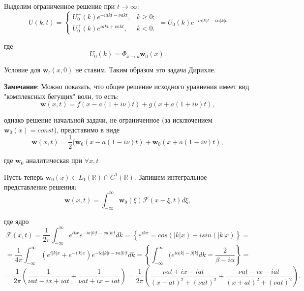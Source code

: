 \documentclass{article}
\begin{document}
Выделим ограниченное решение при $t \to \infty$:
\begin{equation*}
    U(k,t) =
	\begin{cases}
      U_0^-(k) e^{-i a k t - \nu a k t}, & k \geqslant 0;\\
      U_0^+(k) e^{i a k t + \nu a k t},  & k <0.
     \end{cases}
     = U_0(k) e^{-i a |k| t - \nu a |k| t}
\end{equation*}

где
\begin{equation*}
    U_0(k) = \Phi_{x \to k} \mathbf{w}_0(x).
\end{equation*}

Условие для $\mathbf{w}_t(x,0)$ не ставим. Таким образом это задача Дирихле.

\textbf{Замечание}: Можно показать, что общее решение исходного уравнения имеет вид "комплексных бегущих" волн, то есть:
\begin{equation*}
\mathbf{w}(x,t) = f(x-a(1+i\nu)t) + g(x + a(1+i\nu)t),
\end{equation*}

однако решение начальной задачи, не ограниченное (за исключением $\mathbf{w}_0(x) = const$), представимо в виде
\begin{equation*}
\mathbf{w}(x,t) = \dfrac{1}{2}(\mathbf{w}_0 (x-a(1-i\nu)t) + \mathbf{w}_0(x + a(1-i\nu)t),
\end{equation*}

где $\mathbf{w}_0$ аналитическая при $\forall x,t$ 


Пусть теперь $\mathbf{w}_0(x) \in L_1(\mathbb{R}) \cap C^1(\mathbb{R})$. Запишем интегральное представление решения:
\begin{equation*}
    \mathbf{w}(x,t) = \int_{-\infty}^{\infty} \mathbf{w}_0(\xi) \mathcal{F}(x-\xi,t) d\xi,
\end{equation*}

где ядро
$$
\mathcal{F}(x,t) = \frac{1}{2\pi} \int_{-\infty}^{\infty} e^{i k x} e^{-i a |k|t - \nu a |k|t} d k 
= \left\{ e^{ikx} = cos(|k|x)+ i sin(|k|x) \right\} = 
$$$$
= \dfrac{1}{4 \pi} \int_{-\infty}^{\infty} (e^{i|k|x} + e^{-i|k|x}) e^{-ia|k|t - \nu a |k|t} dk  
= \left\{ \int_{-\infty}^{\infty} (e^{i \alpha |k| - \beta |k|} dk =
\dfrac{2}{\beta - i \alpha} \right\} =
$$$$
= \frac{1}{2\pi} \left( \frac{1}{\nu a t - i x + i a t} + \frac{1}{\nu a t + i x + i a t} \right) 
= \frac{1}{2\pi} \left( \frac{\nu a t + i x - i a t}{(x - a t)^2 + (\nu a t)^2} + 
\frac{\nu a t - i x - i a t}{(x + a t)^2 + (\nu a t)^2} \right).
$$ %
\end{document}
